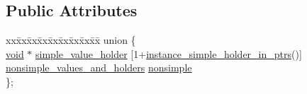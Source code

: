 \subsection*{Public Attributes}
\begin{DoxyCompactItemize}
\item 
\begin{tabbing}
xx\=xx\=xx\=xx\=xx\=xx\=xx\=xx\=xx\=\kill
union \{\\
\>\mbox{\hyperlink{_s_d_l__opengles2__gl2ext_8h_ae5d8fa23ad07c48bb609509eae494c95}{void}} $\ast$ \mbox{\hyperlink{structinstance_a41170a51b771a937d421d60d97d50e48}{simple\_value\_holder}} \mbox{[}1+\mbox{\hyperlink{detail_2common_8h_a24241089c1b051b143781ff5a6193a76}{instance\_simple\_holder\_in\_ptrs}}()\mbox{]}\\
\>\mbox{\hyperlink{structnonsimple__values__and__holders}{nonsimple\_values\_and\_holders}} \mbox{\hyperlink{structinstance_a0a744abc33ad85e3df4d4aa69093f38f}{nonsimple}}\\
\}; \\


\end{tabbing}
\end{DoxyCompactItemize}
